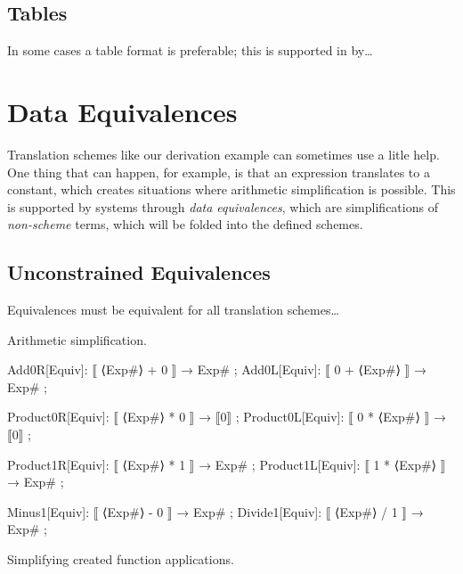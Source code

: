 \documentclass[11pt]{article} %
\begin{document}
\subsection{Tables}

In some cases a table format is preferable; this is supported in \HAX by…\TBD


\section{Data Equivalences}
\label{sec:equiv}

Translation schemes like our derivation example can sometimes use a litle help. One thing that can
happen, for example, is that an expression translates to a constant, which creates situations where
arithmetic simplification is possible. This is supported by \HAX systems through \emph{data
  equivalences}, which are simplifications of \emph{non-scheme} terms, which will be folded into the
defined schemes.

\subsection{Unconstrained Equivalences}

\begin{invariant}
  Equivalences must be equivalent for all translation schemes…
\end{invariant}

\begin{example}
  Arithmetic simplification.
\begin{code}
Add0R[Equiv]: ⟦ ⟨Exp#⟩ + 0 ⟧ → Exp# ;
Add0L[Equiv]: ⟦ 0 + ⟨Exp#⟩ ⟧ → Exp# ;

Product0R[Equiv]: ⟦ ⟨Exp#⟩ * 0 ⟧ → ⟦0⟧ ;
Product0L[Equiv]: ⟦ 0 * ⟨Exp#⟩ ⟧ → ⟦0⟧ ;

Product1R[Equiv]: ⟦ ⟨Exp#⟩ * 1 ⟧ → Exp# ;
Product1L[Equiv]: ⟦ 1 * ⟨Exp#⟩ ⟧ → Exp# ;

Minus1[Equiv]:  ⟦ ⟨Exp#⟩ - 0 ⟧ → Exp# ;
Divide1[Equiv]: ⟦ ⟨Exp#⟩ / 1 ⟧ → Exp# ;
\end{code}
\end{example}

\begin{example}
  Simplifying created function applications.
\end{example}
\end{document}
